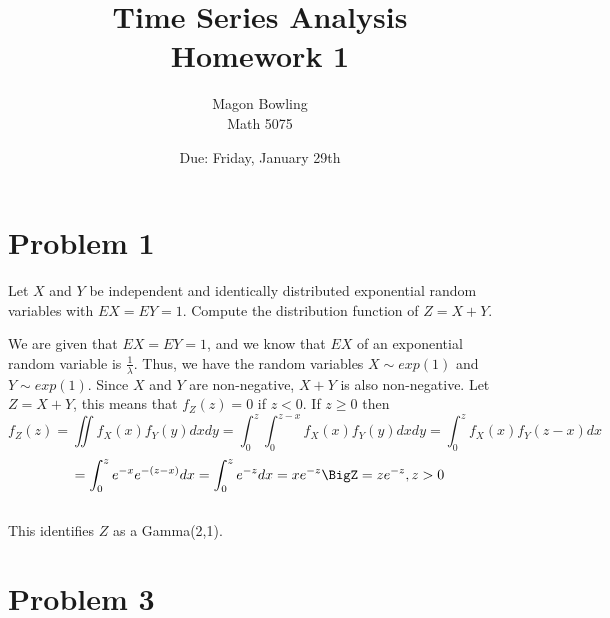 \documentclass[11pt]{article}
\theoremstyle{definition}
\newcommand{\1}[1]{\mathbf{1} \left \{ #1 \right \}}
\begin{document}
\title{Time Series Analysis \\ Homework 1}
\date{Due: Friday, January 29th}
\author{Magon Bowling \\ Math 5075}

\maketitle

\section{{\color{red} \textbf{Problem 1}}}

\item Let $X$ and $Y$ be independent and identically distributed exponential random variables with \(EX = EY = 1\).  Compute the distribution function of \(Z = X + Y \).
\\
\item We are given that \(EX = EY = 1\), and we know that $EX$ of an exponential random variable is \(\frac{1}{\lambda}\). Thus, we have the random variables \(X \sim exp(1)\) and \(Y \sim exp(1)\).  Since $X$ and $Y$ are non-negative, $X + Y$ is also non-negative.  Let $Z = X + Y$, this means that \(f_Z (z) = 0\) if $z<0$.  If $z \geq 0$ then
\[f_Z (z) = \iint f_X (x) f_Y (y) dx dy = \int_0^z \int_0^{z-x} f_X (x) f_Y (y) dx dy = \int_0^z f_X (x) f_Y (z-x) dx\]
\[= \int_0^z e^{-x} e^{-(z-x)} dx = \int_0^z e^{-z} dx = xe^{-z}\BigZ = ze^{-z}, z>0 \]
\\
This identifies $Z$ as a Gamma(2,1).

\section{{\color{red} \textbf{Problem 3}}}
\end{document}
